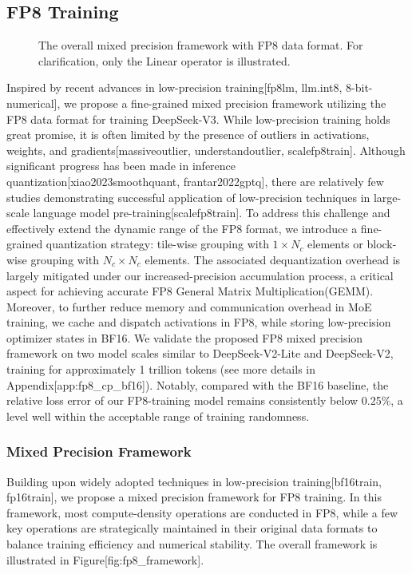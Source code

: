 \documentclass[11pt,a4paper]{article}
\begin{document}
\subsection{FP8 Training}

\begin{figure}[h]
\caption{The overall mixed precision framework with FP8 data format. For clarification, only the Linear operator is illustrated.}
\end{figure}

Inspired by recent advances in low-precision training[fp8lm, llm.int8, 8-bit-numerical], we propose a fine-grained mixed precision framework utilizing the FP8 data format for training DeepSeek-V3. While low-precision training holds great promise, it is often limited by the presence of outliers in activations, weights, and gradients[massiveoutlier, understandoutlier, scalefp8train]. Although significant progress has been made in inference quantization[xiao2023smoothquant, frantar2022gptq], there are relatively few studies demonstrating successful application of low-precision techniques in large-scale language model pre-training[scalefp8train]. To address this challenge and effectively extend the dynamic range of the FP8 format, we introduce a fine-grained quantization strategy: tile-wise grouping with  $1\times N_c$  elements or block-wise grouping with  $N_c\times N_c$  elements. The associated dequantization overhead is largely mitigated under our increased-precision accumulation process, a critical aspect for achieving accurate FP8 General Matrix Multiplication(GEMM). Moreover, to further reduce memory and communication overhead in MoE training, we cache and dispatch activations in FP8, while storing low-precision optimizer states in BF16. We validate the proposed FP8 mixed precision framework on two model scales similar to DeepSeek-V2-Lite and DeepSeek-V2, training for approximately 1 trillion tokens (see more details in Appendix[app:fp8\_cp\_bf16]). Notably, compared with the BF16 baseline, the relative loss error of our FP8-training model remains consistently below 0.25\%, a level well within the acceptable range of training randomness.

\subsubsection{Mixed Precision Framework}

Building upon widely adopted techniques in low-precision training[bf16train, fp16train], we propose a mixed precision framework for FP8 training. In this framework, most compute-density operations are conducted in FP8, while a few key operations are strategically maintained in their original data formats to balance training efficiency and numerical stability. The overall framework is illustrated in Figure[fig:fp8\_framework].
\end{document}
